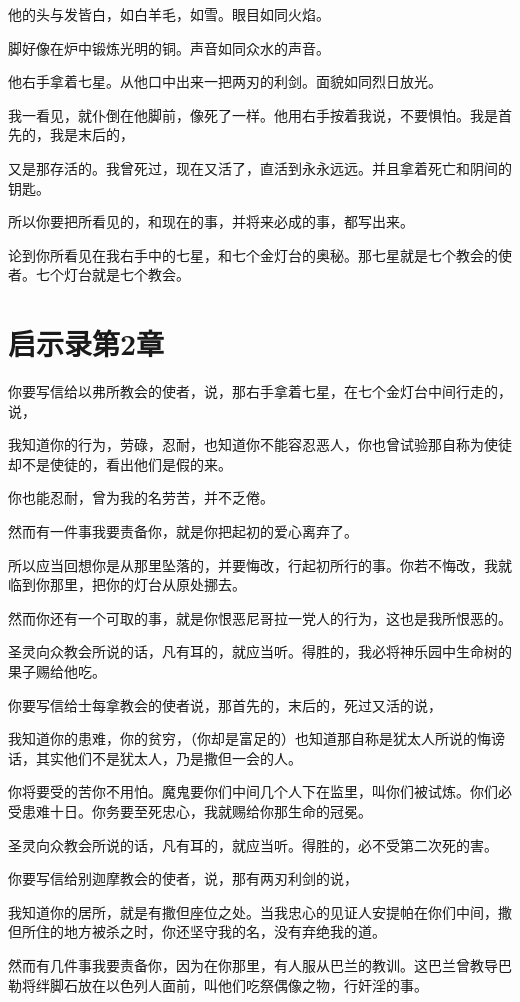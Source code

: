 \documentclass[12pt,oneside]{book}
\begin{document}
他的头与发皆白，如白羊毛，如雪。眼目如同火焰。

脚好像在炉中锻炼光明的铜。声音如同众水的声音。

他右手拿着七星。从他口中出来一把两刃的利剑。面貌如同烈日放光。

我一看见，就仆倒在他脚前，像死了一样。他用右手按着我说，不要惧怕。我是首先的，我是末后的，

又是那存活的。我曾死过，现在又活了，直活到永永远远。并且拿着死亡和阴间的钥匙。

所以你要把所看见的，和现在的事，并将来必成的事，都写出来。

论到你所看见在我右手中的七星，和七个金灯台的奥秘。那七星就是七个教会的使者。七个灯台就是七个教会。

\chapter{启示录第2章}
你要写信给以弗所教会的使者，说，那右手拿着七星，在七个金灯台中间行走的，说，

我知道你的行为，劳碌，忍耐，也知道你不能容忍恶人，你也曾试验那自称为使徒却不是使徒的，看出他们是假的来。

你也能忍耐，曾为我的名劳苦，并不乏倦。

然而有一件事我要责备你，就是你把起初的爱心离弃了。

所以应当回想你是从那里坠落的，并要悔改，行起初所行的事。你若不悔改，我就临到你那里，把你的灯台从原处挪去。

然而你还有一个可取的事，就是你恨恶尼哥拉一党人的行为，这也是我所恨恶的。

圣灵向众教会所说的话，凡有耳的，就应当听。得胜的，我必将神乐园中生命树的果子赐给他吃。

你要写信给士每拿教会的使者说，那首先的，末后的，死过又活的说，

我知道你的患难，你的贫穷，（你却是富足的）也知道那自称是犹太人所说的悔谤话，其实他们不是犹太人，乃是撒但一会的人。

你将要受的苦你不用怕。魔鬼要你们中间几个人下在监里，叫你们被试炼。你们必受患难十日。你务要至死忠心，我就赐给你那生命的冠冕。

圣灵向众教会所说的话，凡有耳的，就应当听。得胜的，必不受第二次死的害。

你要写信给别迦摩教会的使者，说，那有两刃利剑的说，

我知道你的居所，就是有撒但座位之处。当我忠心的见证人安提帕在你们中间，撒但所住的地方被杀之时，你还坚守我的名，没有弃绝我的道。

然而有几件事我要责备你，因为在你那里，有人服从巴兰的教训。这巴兰曾教导巴勒将绊脚石放在以色列人面前，叫他们吃祭偶像之物，行奸淫的事。
\end{document}
